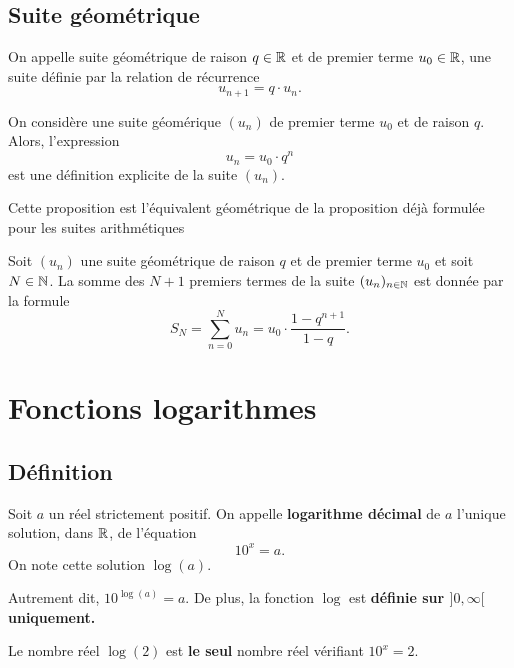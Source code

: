 \documentclass[frenchb]{report}
\begin{document}
\section{Suite géométrique}

\begin{defn}
On appelle suite géométrique de raison $q \in \mathbb{R}$ et de premier terme $u_0 \in \mathbb{R}$, une suite définie par la relation de récurrence 
\[ u_{n+1} = q \cdot u_n .\]
\end{defn}

\begin{prop}
On considère une suite géomérique $(u_n)$ de premier terme $u_0$ et de raison $q$. Alors, l'expression 
\[ u_n = u_0 \cdot q^n \]
est une définition explicite de la suite $(u_n)$.
\end{prop}

\begin{rmq}
Cette proposition est l'équivalent géométrique de la proposition déjà formulée pour les suites arithmétiques
\end{rmq}

\begin{prop}
Soit $(u_n)$ une suite géométrique de raison $q$ et de premier terme $u_0$ et soit $N \in \mathbb{N}$. La somme des $N+1$ premiers termes de la suite $(u_n)_{n \in \mathbb{N}}$ est donnée par la formule 
\[ S_N = \sum_{n=0}^N u_n = u_0 \cdot \frac{1-q^{n+1}}{1-q}. \]
\end{prop}

\chapter{Fonctions logarithmes}

\section{Définition}

\begin{defn}
Soit $a$ un réel strictement positif. On appelle \textbf{logarithme décimal} de $a$ l'unique solution, dans $\mathbb{R}$, de l'équation 
\[ 10^x = a . \]
On note cette solution $\log(a)$.
\end{defn}

\begin{rmq}
Autrement dit, $10^{\log(a)} = a$. De plus, la fonction $\log$ est \textbf{définie sur $]0, \infty[$ uniquement.}
\end{rmq}

\begin{ex}
Le nombre réel $\log(2)$ est \textbf{le seul} nombre réel vérifiant $10^x = 2$.
\end{ex}
\end{document}
